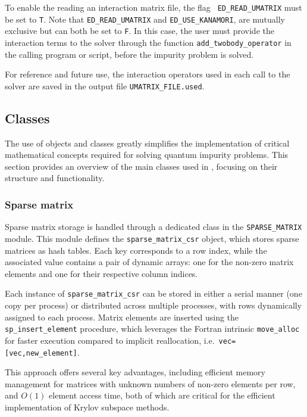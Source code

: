 \documentclass[edipack2.tex]{subfiles}
\begin{document}
To enable the reading an interaction matrix file, the flag {\tt
  ED\_READ\_UMATRIX} must be set to {\tt T}.
Note that {\tt ED\_READ\_UMATRIX} and {\tt ED\_USE\_KANAMORI},
are mutually exclusive but can both be set to {\tt F}. 
In this case, the user must 
provide the interaction terms to the solver through the function 
{\tt add\_twobody\_operator} in the calling program or script, before 
the impurity problem is solved.

For reference and future use, the interaction operators used in each 
call to the solver are saved in the output file 
{\tt UMATRIX\_FILE.used}.

















\subsection{Classes}
The use of objects and classes greatly simplifies the implementation 
of critical mathematical concepts required for solving quantum 
impurity problems. This section provides an overview of the main 
classes used in \NAME, focusing on their structure and functionality.


\subsubsection{Sparse matrix}\label{CodeSparseMatrix}
Sparse matrix storage is handled through a dedicated class in the 
{\tt SPARSE\_MATRIX} module. This module defines the 
{\tt sparse\_matrix\_csr} object, which stores sparse matrices as 
hash tables. Each key corresponds to a row index, while the associated 
value contains a pair of dynamic arrays: one for the non-zero matrix 
elements and one for their respective column indices.

Each instance of {\tt sparse\_matrix\_csr} can be stored in either 
a serial manner (one copy per process) or distributed across multiple 
processes, with rows dynamically assigned to each process. 
Matrix elements are inserted using the 
{\tt sp\_insert\_element} procedure, which leverages the Fortran 
intrinsic {\tt move\_alloc} for faster execution compared to 
implicit reallocation, i.e.~{\tt vec=[vec,new\_element]}. 

This approach offers several key advantages, including efficient 
memory management for matrices with unknown numbers of non-zero 
elements per row, and $O(1)$ element access time, both of which 
are critical for the efficient implementation of Krylov subspace 
methods.
\end{document}
